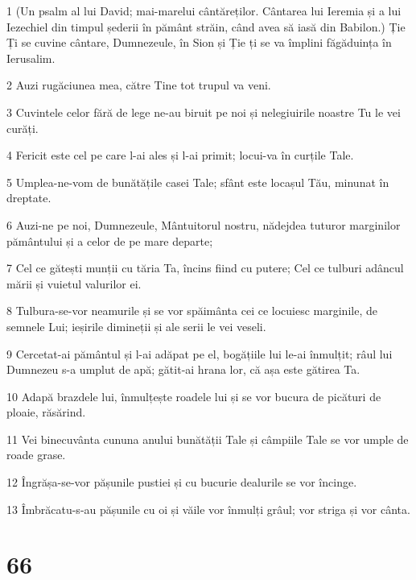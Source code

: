 \par 1 (Un psalm al lui David; mai-marelui cântăreților. Cântarea lui Ieremia și a lui Iezechiel din timpul șederii în pământ străin, când avea să iasă din Babilon.) Ție Ți se cuvine cântare, Dumnezeule, în Sion și Ție ți se va împlini făgăduința în Ierusalim.
\par 2 Auzi rugăciunea mea, către Tine tot trupul va veni.
\par 3 Cuvintele celor fără de lege ne-au biruit pe noi și nelegiuirile noastre Tu le vei curăți.
\par 4 Fericit este cel pe care l-ai ales și l-ai primit; locui-va în curțile Tale.
\par 5 Umplea-ne-vom de bunătățile casei Tale; sfânt este locașul Tău, minunat în dreptate.
\par 6 Auzi-ne pe noi, Dumnezeule, Mântuitorul nostru, nădejdea tuturor marginilor pământului și a celor de pe mare departe;
\par 7 Cel ce gătești munții cu tăria Ta, încins fiind cu putere; Cel ce tulburi adâncul mării și vuietul valurilor ei.
\par 8 Tulbura-se-vor neamurile și se vor spăimânta cei ce locuiesc marginile, de semnele Lui; ieșirile dimineții și ale serii le vei veseli.
\par 9 Cercetat-ai pământul și l-ai adăpat pe el, bogățiile lui le-ai înmulțit; râul lui Dumnezeu s-a umplut de apă; gătit-ai hrana lor, că așa este gătirea Ta.
\par 10 Adapă brazdele lui, înmulțește roadele lui și se vor bucura de picături de ploaie, răsărind.
\par 11 Vei binecuvânta cununa anului bunătății Tale și câmpiile Tale se vor umple de roade grase.
\par 12 Îngrășa-se-vor pășunile pustiei și cu bucurie dealurile se vor încinge.
\par 13 Îmbrăcatu-s-au pășunile cu oi și văile vor înmulți grâul; vor striga și vor cânta.

\chapter{66}

